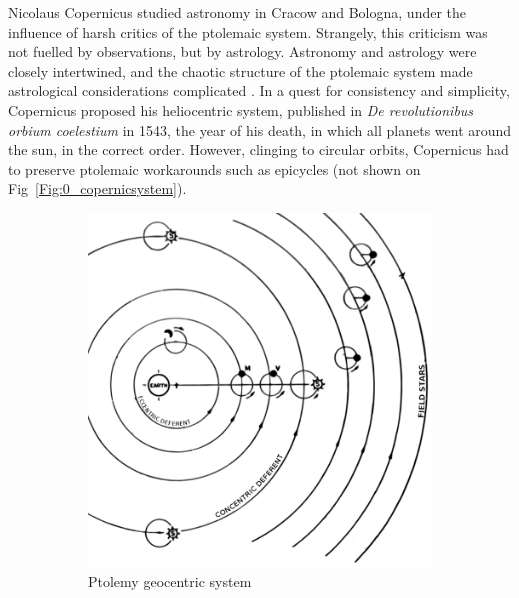 Nicolaus Copernicus studied astronomy in Cracow and Bologna, under the influence of harsh critics of the ptolemaic system. Strangely, this criticism was not fuelled by observations, but by astrology. Astronomy and astrology were closely intertwined, and the chaotic structure of the ptolemaic system made astrological considerations complicated \citep{Barker2014}. In a quest for consistency and simplicity, Copernicus proposed his heliocentric system, published in \textit{De revolutionibus orbium coelestium} in 1543, the year of his death, in which all planets went around the sun, in the correct order. However, clinging to circular orbits, Copernicus had to preserve ptolemaic workarounds such as epicycles (not shown on Fig~\ref{Fig:0_copernicsystem}). 



\begin{figure}
\center
    \centering
    \begin{subfigure}[b]{0.48\textwidth}
    	\centering
    	\includegraphics[width=0.9\linewidth]{Figures/0_PtolemaicModel_2.png}
        \caption{Ptolemy geocentric system}
        \label{Fig:0_ptolemaicsystem}
    \end{subfigure}
    ~~
    \begin{subfigure}[b]{0.48\textwidth}
    	\centering

\end{subfigure}
\end{figure}
